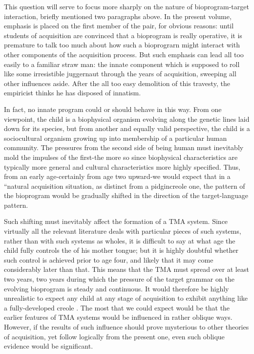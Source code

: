 This question will serve to focus more sharply on the nature of bioprogram-target interaction, briefly mentioned two paragraphs above. In the present volume, emphasis is placed on the first member of the pair, for obvious reasons: until students of acquisition are convinced that a bioprogram is really operative, it is premature to talk too much about how such a bioprograrn might interact with other components of the acquisition process. But such emphasis can lead all too easily to a familiar straw man: the innate component which is supposed to roll like some irresistible juggernaut through the years of acquisition, sweeping all other influences aside. After the all too easy demolition of this travesty, the empiricist thinks he has disposed of innatism.

In fact, no innate program could or should behave in this way. From one viewpoint, the child is a biophysical organism evolving along the genetic lines laid down for its species, but from another and equally valid perspective, the child is a sociocultural organism growing up into membership of a particular human community. The pressures from the second side of being human must inevitably mold the impulses of the first-the more so since biophysical characteristics are typically more general and cultural characteristics more highly specified. Thus, from an early age-certainly from age two upward-we would expect that in a ``natural acquisition situation, as distinct from a pidgin\-creole one, the pattern of the bioprogram would be gradually shifted in the direction of the target-language pattern.

Such shifting must inevitably affect the formation of a TMA
system. Since virtually all the relevant literature deals with  particular pieces of such systems, rather than with such systems as wholes, it is difficult to say at what age the child fully controls the  of his mother tongue; but it is highly doubtful whether such control is achieved prior to age four, and likely that it may come considerably later than that. This means that the  TMA must spread over at least two years, two years during which the pres\-sure of the target grammar on the evolving bioprogram is steady and continuous. It would therefore be highly unrealistic to expect any child at any stage of acquisition to exhibit anything like a fully-developed creole . The most that we could expect would be that  the earlier features of TMA systems would be influ\-enced in rather oblique ways. However, if the results of such influence should prove mysterious to other theories of acquisition, yet follow logically from the present one, even such oblique evidence would be significant.

